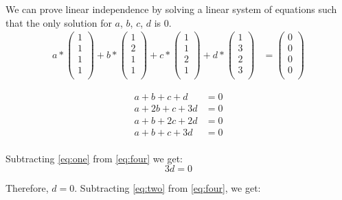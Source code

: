 \documentclass[12pt]{article}
\begin{document}
\begin{itemize}
We can prove linear independence by solving a linear system of equations such that the only solution for $a$, $b$, $c$, $d$ is 0. \\
\begin{align*}
    a * \begin{pmatrix}
    1 \\
    1 \\
    1 \\
    1 \\
    \end{pmatrix} + b * \begin{pmatrix}
    1 \\
    2 \\
    1 \\
    1 \\
    \end{pmatrix} + c * \begin{pmatrix}
    1 \\
    1 \\
    2 \\
    1 \\
    \end{pmatrix} + d * \begin{pmatrix}
    1 \\
    3 \\
    2 \\
    3 \\
    \end{pmatrix} &= \begin{pmatrix}
    0 \\
    0 \\
    0 \\
    0 \\
    \end{pmatrix}
\end{align*}

\begin{align*}
    a + b + c + d &= 0 \label{eq:one} \tag{1} \\
    a + 2b + c + 3d &= 0 \label{eq:two} \tag{2}\\
    a + b + 2c + 2d &= 0 \label{eq:three} \tag{3} \\
    a + b + c + 3d &= 0 \label{eq:four} \tag{4} \\
\end{align*}

Subtracting \eqref{eq:one} from \eqref{eq:four} we get: 
\[3d = 0\]

Therefore, $d=0$. Subtracting \eqref{eq:two} from \eqref{eq:four}, we get:


\end{itemize}
\end{document}
